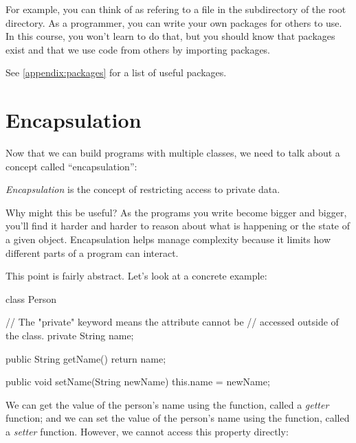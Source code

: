 For example, you can think of  as refering to a file  in the  subdirectory of the  root directory. As a programmer, you can write your own packages for others to use. In this course, you won't learn to do that, but you should know that packages exist and that we use code from others by importing packages.

See \ref{appendix:packages} for a list of useful packages.

\section{Encapsulation}

Now that we can build programs with multiple classes, we need to talk about a concept called ``encapsulation'':

\begin{definition}
\emph{Encapsulation} is the concept of restricting access to private data.
\end{definition}

Why might this be useful? As the programs you write become bigger and bigger, you'll find it harder and harder to reason about what is happening or the state of a given object. Encapsulation helps manage complexity because it limits how different parts of a program can interact.


This point is fairly abstract. Let's look at a concrete example:

\begin{code}
class Person {
  // The "private" keyword means the attribute cannot be
  // accessed outside of the class.
  private String name;

  public String getName() {
    return name;
  }

  public void setName(String newName) {
    this.name = newName;
  }
}
\end{code}

We can get the value of the person's name using the  function, called a \emph{getter} function; and we can set the value of the person's name using the  function, called a \emph{setter} function. However, we cannot access this property directly:

